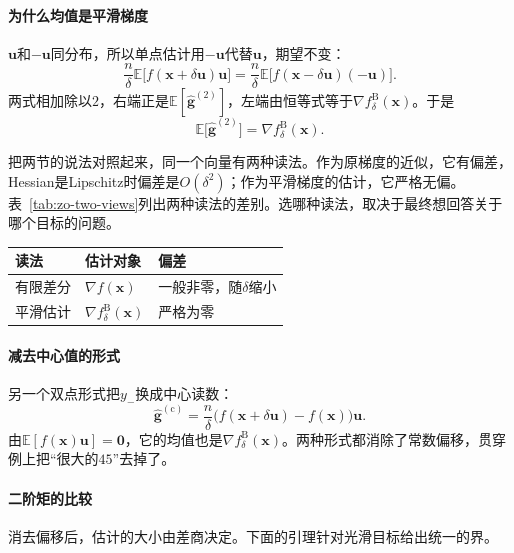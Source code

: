 \paragraph{为什么均值是平滑梯度}
$\bm{u}$和$-\bm{u}$同分布，所以单点估计用$-\bm{u}$代替$\bm{u}$，期望不变：
\[
 \frac{n}{\delta}\mathbb{E}\bigl[f(\bm{x}+\delta\bm{u})\bm{u}\bigr]
 =\frac{n}{\delta}\mathbb{E}\bigl[f(\bm{x}-\delta\bm{u})(-\bm{u})\bigr].
\]
两式相加除以$2$，右端正是$\mathbb{E}[\hat{\bm{g}}^{(2)}]$，左端由恒等式等于$\nabla f^{\mathrm{B}}_{\delta}(\bm{x})$。于是
\begin{equation}
 \mathbb{E}\bigl[\hat{\bm{g}}^{(2)}\bigr]=\nabla f^{\mathrm{B}}_{\delta}(\bm{x}).
 \label{eq:zo-two-point-mean}
\end{equation}

把两节的说法对照起来，同一个向量有两种读法。作为原梯度的近似，它有偏差，Hessian是Lipschitz时偏差是$O(\delta^2)$；作为平滑梯度的估计，它严格无偏。表~\ref{tab:zo-two-views}列出两种读法的差别。选哪种读法，取决于最终想回答关于哪个目标的问题。

\begin{BookInlineTable}
  \centering
  \begin{tabular}{@{}lll@{}}
    \toprule
    读法 & 估计对象 & 偏差\\
    \midrule
    有限差分 & $\nabla f(\bm{x})$ & 一般非零，随$\delta$缩小\\
    平滑估计 & $\nabla f^{\mathrm{B}}_{\delta}(\bm{x})$ & 严格为零\\
    \bottomrule
  \end{tabular}
  \caption{同一个双点向量的两种读法。原目标不可微时第一种读法没有对象，第二种仍然成立。}
  \label{tab:zo-two-views}
\end{BookInlineTable}

\paragraph{减去中心值的形式}
另一个双点形式把$y_-$换成中心读数：
\begin{equation}
 \hat{\bm{g}}^{(\mathrm{c})}=\frac{n}{\delta}\bigl(f(\bm{x}+\delta\bm{u})-f(\bm{x})\bigr)\bm{u}.
 \label{eq:zo-center-point}
\end{equation}
由$\mathbb{E}[f(\bm{x})\bm{u}]=\bm{0}$，它的均值也是$\nabla f^{\mathrm{B}}_{\delta}(\bm{x})$。两种形式都消除了常数偏移，贯穿例上把“很大的$45$”去掉了。

\paragraph{二阶矩的比较}
消去偏移后，估计的大小由差商决定。下面的引理针对光滑目标给出统一的界。


